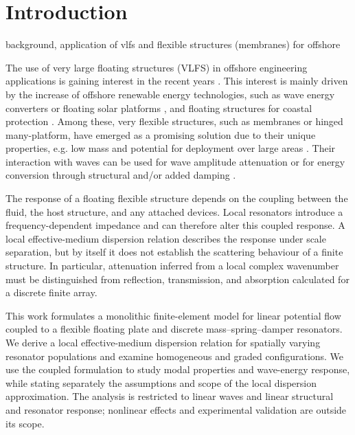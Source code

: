 \section{Introduction}

\begin{itemize}
    {\color{red} \item background, application of vlfs and flexible structures (membranes) for offshore}
The use of very large floating structures (VLFS) in offshore engineering applications is gaining interest in the recent years \cite{lamas2015review}. This interest is mainly driven by the increase of offshore renewable energy technologies, such as wave energy converters \cite{cheng2024wave,renzi2021niche} or floating solar platforms  \cite{liu2024review,huang2023comprehensive}, and floating structures for coastal protection \cite{samuel2025motion,peng2023computational}. Among these, very flexible structures, such as membranes or hinged many-platform, have emerged as a promising solution due to their unique properties, e.g. low mass and potential for deployment over large areas \cite{zhang2022review,koley2022performance}. 
%
Their interaction with waves can be used for wave amplitude attenuation or for energy conversion through
structural and/or added damping \cite{venkateswarlu2021wave,michele2020wave,
collins2021flexible,boren2021distributed,kargar2022atlas,moretti2022high}.

{\color{red}The response of a floating flexible structure depends on the coupling between the fluid, the host structure, and any attached devices. Local resonators
introduce a frequency-dependent impedance and can therefore alter this coupled
response. A local effective-medium dispersion relation describes the response
under scale separation, but by itself it does not establish the scattering
behaviour of a finite structure. In particular, attenuation inferred from a
local complex wavenumber must be distinguished from reflection, transmission,
and absorption calculated for a discrete finite array.

This work formulates a monolithic finite-element model for linear potential
flow coupled to a flexible floating plate and discrete mass--spring--damper
resonators. We derive a local effective-medium dispersion relation for spatially
varying resonator populations and examine homogeneous and graded configurations.
We use the coupled formulation to study modal properties and wave-energy
response, while stating separately the assumptions and scope of the local
dispersion approximation. The analysis is restricted to linear waves and
linear structural and resonator response; nonlinear effects and experimental
validation are outside its scope.}


\end{itemize}
